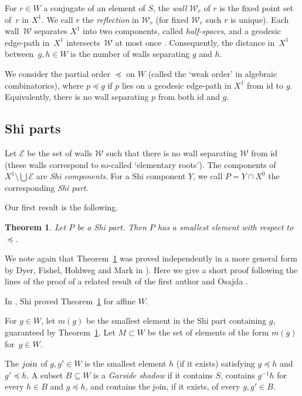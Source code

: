 \documentclass[11pt]{article}
\newtheorem{thm}[theo]{Theorem}
\theoremstyle{definition}
\numberwithin{equation}{section}
\newcommand{\id}{\mathrm{id}}
\begin{document}
For $r\in W$ a conjugate of an element of $S$, the \emph{wall}
$\mathcal W_r$ of $r$ is the fixed point set of~$r$ in $X^1$. We call $r$ the \emph{reflection} in $\mathcal W_r$ (for fixed $\mathcal W_r$ such $r$
is unique). Each wall~$\mathcal W$ separates $X^1$ into two components, called \emph{half-spaces}, and a geodesic edge-path in~$X^1$ intersects~$\mathcal W$ at most once \cite[Lem~2.5]{Ronan_2009}. Consequently, the distance in~$X^1$ between~$g,h\in W$ is the number of walls separating $g$ and $h$. 

We consider the partial order $\preceq$ on $W$ (called the `weak order' in algebraic combinatorics), where $p \preceq g$ if $p$ lies on a geodesic edge-path in $X^1$ from $\id$ to $g$. Equivalently, there is no wall separating $p$ from both $\id$ and $g$.

\subsection*{Shi parts} 

Let $\mathcal E$ be the set of walls $\mathcal W$ such that there is no wall separating $\mathcal W$ from  $\id$ (these walls correspond to so-called `elementary roots'). The components of~$X^1 \setminus \bigcup \mathcal E$ are \emph{Shi components}. For a Shi component $Y$, we call $P = Y \cap X^0$ the corresponding \emph{Shi part}.

Our first result is the following.

\begin{thm} 
	\label{thm:Shi}
	Let $P$ be a Shi part. Then $P$ has a smallest element with respect to~$\preceq$.
\end{thm}

We note again that Theorem~\ref{thm:Shi} was proved independently in a more general form by Dyer, Fishel, Hohlweg and Mark in \cite[Thm.~1.1(1)]{DHFM}). 
Here we give a short proof following the lines of the proof of a related result of the first author and Osajda \cite[Thm.~2.1]{OP}.

In \cite{Shi_1987}, Shi proved Theorem~\ref{thm:Shi} for affine $W$.

For $g\in W$, let $m(g)$ be the smallest element in the Shi part containing $g$, guaranteed by Theorem~\ref{thm:Shi}. 
Let $M\subset W$ be the set of elements of the form $m(g)$ for~$g\in W$. 

The $\emph{join}$ of $g,g'\in W$ is the smallest element $h$ (if it exists) satisfying $g\preceq h$ and~$g'\preceq h$. A subset $B\subseteq W$ is a \emph{Garside shadow} if it contains $S$, contains $g^{-1}h$ for every $h\in B$ and $g\preceq h$, and contains the join, if it exists, of every $g,g'\in B$.
\end{document}
